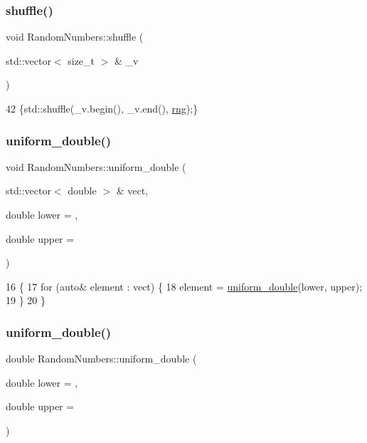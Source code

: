 \subsubsection{\texorpdfstring{shuffle()}{shuffle()}}
{\footnotesize\ttfamily void Random\+Numbers\+::shuffle (\begin{DoxyParamCaption}\item[{std\+::vector$<$ size\+\_\+t $>$ \&}]{\+\_\+v }\end{DoxyParamCaption})\hspace{0.3cm}{\ttfamily [inline]}}


\begin{DoxyCode}
42 \{std::shuffle(\_v.begin(), \_v.end(), \hyperlink{classRandomNumbers_a15ceee85d6d00de12ae76c90aaec2f14}{rng});\}
\end{DoxyCode}
\mbox{\label{classRandomNumbers_ae226c129494f9055ac37ed1af943d010}} 
\subsubsection{\texorpdfstring{uniform\+\_\+double()}{uniform\_double()}\hspace{0.1cm}{\footnotesize\ttfamily [1/2]}}
{\footnotesize\ttfamily void Random\+Numbers\+::uniform\+\_\+double (\begin{DoxyParamCaption}\item[{std\+::vector$<$ double $>$ \&}]{vect,  }\item[{double}]{lower = {},  }\item[{double}]{upper = {} }\end{DoxyParamCaption})}


\begin{DoxyCode}
16 \{
17     \textcolor{keywordflow}{for} (\textcolor{keyword}{auto}& element : vect) \{
18         element = \hyperlink{classRandomNumbers_ae226c129494f9055ac37ed1af943d010}{uniform\_double}(lower, upper);
19     \}
20 \}
\end{DoxyCode}
\mbox{\label{classRandomNumbers_a1e66bf9926ad3916f3804dd20ea393f1}} 
\subsubsection{\texorpdfstring{uniform\+\_\+double()}{uniform\_double()}\hspace{0.1cm}{\footnotesize\ttfamily [2/2]}}
{\footnotesize\ttfamily double Random\+Numbers\+::uniform\+\_\+double (\begin{DoxyParamCaption}\item[{double}]{lower = {},  }\item[{double}]{upper = {} }\end{DoxyParamCaption})}


